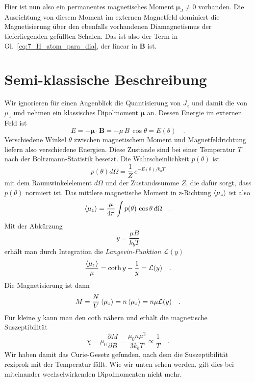 Hier ist nun also ein permanentes magnetisches Moment $\bm{\mu}_J \neq 0$ vorhanden. Die Ausrichtung von diesem Moment im externen Magnetfeld dominiert die Magnetisierung über den ebenfalls vorhandenen Diamagnetismus der tieferliegenden gefüllten Schalen. Das ist also der Term in Gl.~\ref{eq:7_H_atom_para_dia}, der linear in $\bm{B}$ ist.

\section*{Semi-klassische Beschreibung}

Wir ignorieren für einen Augenblick die Quantisierung von $J_z$ und damit die von  $\mu_z$ und nehmen ein klassisches Dipolmoment   $\bm{\mu}$ an. Dessen Energie im externen Feld ist 
\begin{equation}
    E = - \bm{\mu} \cdot \bm{B} = - \mu \, B \, \cos \theta = E(\theta) \quad .
\end{equation}
Verschiedene Winkel $\theta$  zwischen magnetischem Moment und Magnetfeldrichtung liefern also verschiedene Energien. Diese Zustände sind bei einer Temperatur $T$ nach der Boltzmann-Statistik besetzt. Die Wahrscheinlichkeit $p(\theta)$ ist
\begin{equation}
    p(\theta) d \Omega = \frac{1}{Z} \, e^{- E(\theta) / k_b T}
\end{equation}
mit dem Raumwinkelelement $d\Omega$ und der Zustandssumme $Z$, die dafür sorgt, dass $p(\theta)$ normiert ist. Das mittlere magnetische Moment in z-Richtung $ \braket{\mu_z}$ ist also
\begin{equation}
    \braket{\mu_z} = \frac{\mu}{4 \pi } \int p(\theta) \, \cos \theta \, d\Omega \quad .
\end{equation}
Mit der Abkürzung 
\begin{equation}
    y = \frac{\mu B}{k_b T}
\end{equation}
erhält man durch Integration die \emph{Langevin-Funktion} $\mathcal{L}(y)$ 
\begin{equation}
    \frac{ \braket{\mu_z}}{\mu} = \coth y - \frac{1}{y} = \mathcal{L}(y) \quad .
\end{equation}
Die Magnetisierung ist dann
\begin{equation}
    M = \frac{N}{V}\braket{\mu_z} = n \braket{\mu_z} = n \mu \mathcal{L}(y)   \quad .
\end{equation}
Für kleine $y$ kann man den coth nähern und erhält die magnetische Suszeptibilität
\begin{equation}
    \chi = \mu_0 \frac{\partial M}{\partial B} = \frac{\mu_0 n \mu^2}{3 k_b T} \propto \frac{1}{T}  \quad .
\end{equation}
Wir haben damit das Curie-Gesetz gefunden, nach dem die Suszeptibilität reziprok mit der Temperatur fällt. Wie wir unten sehen werden, gilt dies bei miteinander wechselwirkenden Dipolmomenten nicht mehr.

